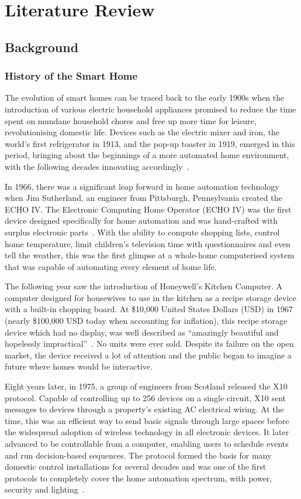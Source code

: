 \chapter{Literature Review}\label{ch:lit_review}

\section{Background}

\subsection{History of the Smart Home}
The evolution of smart homes can be traced back to the early 1900s when the introduction of various electric household appliances promised to reduce the time spent on mundane household chores and free up more time for leisure, revolutionising domestic life.
Devices such as the electric mixer and iron, the world's first refrigerator in 1913, and the pop-up toaster in 1919, emerged in this period, bringing about the beginnings of a more automated home environment, with the following decades innovating accordingly~\cite{Hert16}.

In 1966, there was a significant leap forward in home automation technology when Jim Sutherland, an engineer from Pittsburgh, Pennsylvania created the ECHO IV.
The Electronic Computing Home Operator (ECHO IV) was the first device designed specifically for home automation and was hand-crafted with surplus electronic parts~\cite{Spic16}.
With the ability to compute shopping lists, control home temperature, limit children's television time with questionnaires and even tell the weather, this was the first glimpse at a whole-home computerised system that was capable of automating every element of home life.

The following year saw the introduction of Honeywell's Kitchen Computer.
A computer designed for housewives to use in the kitchen as a recipe storage device with a built-in chopping board.
At \$10,000 United States Dollars (USD) in 1967 (nearly \$100,000 USD today when accounting for inflation), this recipe storage device which had no display, was well described as ``amazingly beautiful and hopelessly impractical''~\cite{MANA23,Stei11,USIC}.
No units were ever sold.
Despite its failure on the open market, the device received a lot of attention and the public began to imagine a future where homes would be interactive.

Eight years later, in 1975, a group of engineers from Scotland released the X10 protocol.
Capable of controlling up to 256 devices on a single circuit, X10 sent messages to devices through a property's existing AC electrical wiring.
At the time, this was an efficient way to send basic signals through large spaces before the widespread adoption of wireless technology in all electronic devices.
It later advanced to be controllable from a computer, enabling users to schedule events and run decision-based sequences.
The protocol formed the basis for many domestic control installations for several decades and was one of the first protocols to completely cover the home automation spectrum, with power, security and lighting~\cite{X10}.


